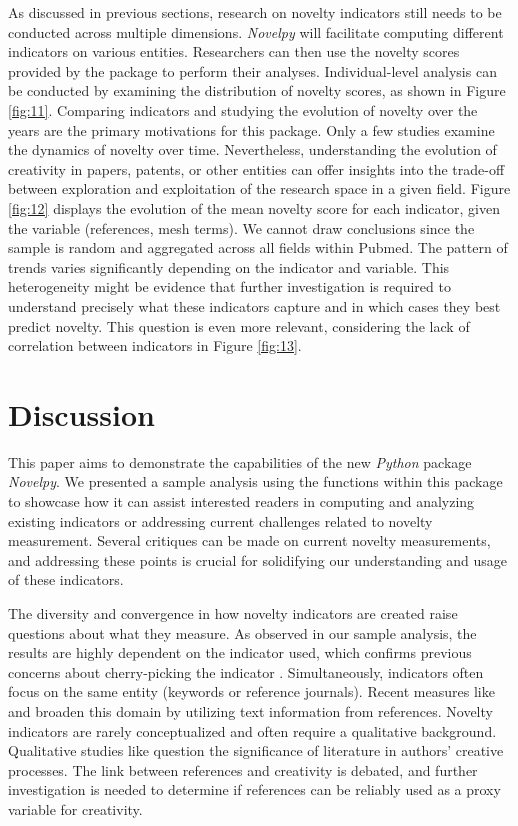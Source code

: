 As discussed in previous sections, research on novelty indicators still needs to be conducted across multiple dimensions. \textit{Novelpy} will facilitate computing different indicators on various entities. Researchers can then use the novelty scores provided by the package to perform their analyses. Individual-level analysis can be conducted by examining the distribution of novelty scores, as shown in Figure \ref{fig:11}. Comparing indicators and studying the evolution of novelty over the years are the primary motivations for this package. Only a few studies examine the dynamics of novelty over time.
Nevertheless, understanding the evolution of creativity in papers, patents, or other entities can offer insights into the trade-off between exploration and exploitation of the research space in a given field. Figure \ref{fig:12} displays the evolution of the mean novelty score for each indicator, given the variable (references, mesh terms). We cannot draw conclusions since the sample is random and aggregated across all fields within Pubmed. The pattern of trends varies significantly depending on the indicator and variable. This heterogeneity might be evidence that further investigation is required to understand precisely what these indicators capture and in which cases they best predict novelty. This question is even more relevant, considering the lack of correlation between indicators in Figure \ref{fig:13}.


\section{Discussion}

This paper aims to demonstrate the capabilities of the new \textit{Python} package \textit{Novelpy}. We presented a sample analysis using the functions within this package to showcase how it can assist interested readers in computing and analyzing existing indicators or addressing current challenges related to novelty measurement. Several critiques can be made on current novelty measurements, and addressing these points is crucial for solidifying our understanding and usage of these indicators.

The diversity and convergence in how novelty indicators are created raise questions about what they measure. As observed in our sample analysis, the results are highly dependent on the indicator used, which confirms previous concerns about cherry-picking the indicator \citep{shibayama2021measuring,foster2021surprise}. Simultaneously, indicators often focus on the same entity (keywords or reference journals). Recent measures like \cite{shibayama2021measuring} and \cite{arts2021natural} broaden this domain by utilizing text information from references. Novelty indicators are rarely conceptualized and often require a qualitative background. Qualitative studies like \cite{tahamtan2018creativity} question the significance of literature in authors' creative processes. The link between references and creativity is debated, and further investigation is needed to determine if references can be reliably used as a proxy variable for creativity.

